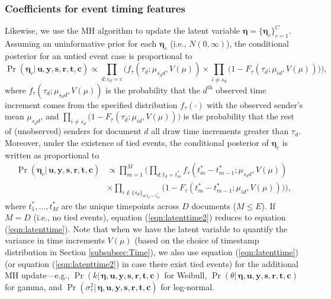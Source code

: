 \documentclass[ba]{imsart}
\numberwithin{equation}{section}
\theoremstyle{plain}
\begin{document}
	\subsubsection{Coefficients for event timing features}
	Likewise, we use the MH algorithm to update the latent variable $\boldsymbol{\eta}=\{\boldsymbol{\eta}_c\}_{c=1}^C$. Assuming an uninformative prior for each $\boldsymbol{\eta}_c$ (i.e., $N({0},\infty)$), the conditional posterior for an untied event case is proportional to~
	\begin{equation}
		\Pr(\boldsymbol{\eta}_c|\, \boldsymbol{u}, \boldsymbol{y},\boldsymbol{s}, \boldsymbol{r},\boldsymbol{t},\boldsymbol{c})\propto \prod_{d:c_d=c}\Big(f_{\tau}(\tau_{d}; \mu_{s_d d}, V(\mu))\times \prod_{i\neq s_d}\big(1-F_{\tau}(\tau_{d}; \mu_{id}, V(\mu)) \big)\Big),
		\label{eqn:latenttime}
	\end{equation}
	where $f_{\tau}(\tau_{d}; \mu_{s_d d}, V(\mu))$ is the probability that the $d^{\textrm{th}}$ observed time increment comes from the specified distribution $f_\tau(\cdot)$ with the observed sender's mean $\mu_{s_d d}$, and $\prod_{i\neq s_d}\big(1-F_{\tau}(\tau_{d}; \mu_{id},V(\mu)) \big)$ is the probability that the rest of (unobserved) senders for document $d$ all draw time increments greater than $\tau_d$. Moreover, under the existence of tied events, the conditional posterior of $\boldsymbol{\eta}_c$ is written as proportional to
	\begin{equation}
		\begin{aligned}
			\Pr(\boldsymbol{\eta}_c|\, \boldsymbol{u}, \boldsymbol{y},\boldsymbol{s}, \boldsymbol{r},\boldsymbol{t},\boldsymbol{c})&\propto \prod_{m=1}^M\Big(\prod_{d:t_d=t_m^*}f_{\tau}(t_m^*-t_{m-1}^*; \mu_{s_d d}, V(\mu)) \\&\times \prod_{i \notin \{s_d\}_{d:t_d=t_m^*}}\big(1-F_{\tau}(t_m^*-t_{m-1}^*; \mu_{id}, V(\mu)) \big)\Big),
		\end{aligned}
		\label{eqn:latenttime2}
	\end{equation}
	where $t_1^*,\ldots,t_M^*$ are the unique timepoints across $D$ documents ($M \leq E$). If $M=D$ (i.e., no tied events), equation (\ref{eqn:latenttime2}) reduces to equation (\ref{eqn:latenttime}). Note that when we have the latent variable to quantify the variance in time increments $V(\mu)$ (based on the choice of timestamp distribution in Section \ref{subsubsec:Time}), we also use equation (\ref{eqn:latenttime}) (or equation (\ref{eqn:latenttime2}) in case there exist tied events) for the additional MH update---e.g., $\Pr(k|\, \boldsymbol{\eta},\boldsymbol{u}, \boldsymbol{y},\boldsymbol{s}, \boldsymbol{r},\boldsymbol{t},\boldsymbol{c})$ for Weibull, $\Pr(\theta|\, \boldsymbol{\eta},\boldsymbol{u}, \boldsymbol{y},\boldsymbol{s}, \boldsymbol{r},\boldsymbol{t},\boldsymbol{c})$ for gamma, and  $\Pr(\sigma^2_\tau| \,\boldsymbol{\eta},\boldsymbol{u}, \boldsymbol{y},\boldsymbol{s}, \boldsymbol{r},\boldsymbol{t},\boldsymbol{c})$ for log-normal.~	
\end{document}
